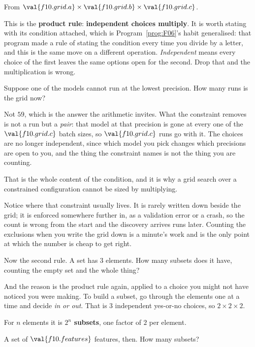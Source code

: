 \begin{fr}
From $\val{f10.grid.a} \times \val{f10.grid.b} \times \val{f10.grid.c}$.

This is the \textbf{product rule}: \textbf{independent choices multiply}. It is
worth stating with its condition attached, which is
Program~\ref{prog:F06}'s habit generalised: that program made a rule of
stating the condition every time you divide by a letter, and this is the same
move on a different operation. \emph{Independent} means every choice of the
first leaves the same options open for the second. Drop that and
the multiplication is wrong.

Suppose one of the models cannot run at the lowest precision. How many runs
is the grid now?
\nextframe
\end{fr}

\begin{fr}
Not $59$, which is the answer the arithmetic invites. What the constraint
removes is not a run but a \emph{pair}: that model at that precision is gone
at every one of the $\val{f10.grid.c}$ batch sizes, so $\val{f10.grid.c}$
runs go with it. The choices are no longer independent, since which model you
pick changes which precisions are open to you, and the thing the constraint
names is not the thing you are counting.

That is the whole content of the condition, and it is why a grid search over a
constrained configuration cannot be sized by multiplying.

Notice where that constraint usually lives. It is rarely written down beside
the grid; it is enforced somewhere further in, as a validation error or a
crash, so the count is wrong from the start and the discovery arrives runs
later. Counting the exclusions when you write the grid down is a minute's work
and is the only point at which the number is cheap to get right.

Now the second rule. A set has $3$ elements. How many subsets does it have,
counting the empty set and the whole thing?
\dotline
\nextframe
\end{fr}

\begin{fr}
And the reason is the product rule again, applied to a choice you might not
have noticed you were making. To build a subset, go through the elements one
at a time and decide \emph{in or out}. That is $3$ independent yes-or-no
choices, so $2 \times 2 \times 2$.

For $n$ elements it is \textbf{$2^{n}$ subsets}, one factor of $2$ per
element.

A set of $\val{f10.features}$ features, then. How many subsets?
\nextframe
\end{fr}

